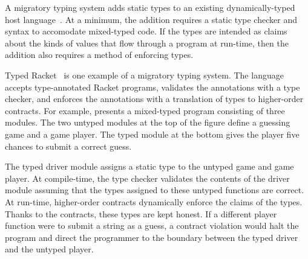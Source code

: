 
A migratory typing system adds static types to an existing
dynamically-typed host language~\cite{tfffgksst-snapl-2017}.
At a minimum, the addition requires a static type checker and
syntax to accomodate mixed-typed code.
If the types are intended as claims about the kinds of values that
flow through a program at run-time, then the addition also requires a method
of enforcing types.

Typed Racket~\cite{tf-popl-2008} is one example of a migratory typing system.
The language accepts type-annotated Racket programs,
validates the annotations with a type checker, and enforces the annotations
with a translation of types to higher-order contracts.
For example,  presents a mixed-typed
program consisting of three modules.
The two untyped modules at the top of the figure define a guessing game
and a game player.
The typed module at the bottom gives the player five chances to submit a
correct guess.

The typed driver module assigns a static type to the untyped game and
 game player.
At compile-time, the type checker validates the contents of the driver module
 assuming that the types assigned to these untyped functions are correct.
At run-time, higher-order contracts dynamically enforce the claims of the types.
Thanks to the contracts, these types are kept honest.
If a different player function were to submit a string as a guess, a contract
 violation would halt the program and direct the programmer to the boundary
 between the typed driver and the untyped player.

